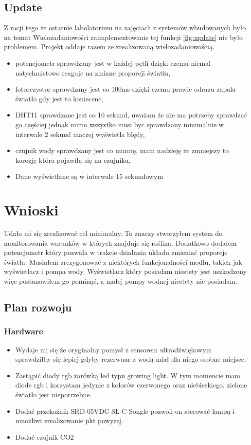 \documentclass[a4paper,11pt]{uzreport}
\begin{document}
    \subsection{Update}
    Z racji tego że ostatnie labolatorium na zajęciach z systemów wbudowanych było na temat Wielozadaniowości zaimplementowanie tej funkcji \ref{fig:update} nie było problemem. Projekt oddaje razem ze zrealizowaną wielozadaniowością.
    \begin{itemize}
        \item potencjometr sprawdzany jest w każdej pętli dzięki czemu niemal natychmistowo reaguje na zmiane proporcji światła,
        \item fotorezystor sprawdzany jest co 100ms dzięki czemu prawie odrazu zapala światło gdy jest to konieczne,
        \item DHT11 sprawdzane jest co 10 sekund, uważam że nie ma potrzeby sprawdzać go częściej jednak mimo wszystko musi byc sprawdzany minimalnie w interwale 2 sekund inaczej wyświetla błędy,
        \item czujnik wody sprawdzany jest co minutę, mam nadzieję że zmniejszy to korozję która pojawiła się na czujniku,
        \item Dane wyświetlane są w interwale 15 sekundowym
    \end{itemize}

\section{Wnioski}
Udało mi się zrealizować cel minimalny. To znaczy stworzyłem system do monitorowania warunków w których znajduje się roślina. Dodatkowo dodałem potencjometr który pozwala w trakcie działania układu zmieniać proporcje światła. Musiałem zrezygonować z niektórych funkcjonalności modlu, takich jak wyświetlacz i pompa wody. Wyświetlacz który posiadam niestety jest uszkodzony więc postanowiłem go pominąć, a małej pompy wodnej niestety nie posiadam.
\subsection{Plan rozwoju}
\subsubsection{Hardware}
\begin{itemize}
    \item  Wydaje mi się że oryginalny pomysł z sensorem ultradźwiękowym sprawdziłby się lepiej gdyby rezerwuar z wodą miał dla niego osobne miejsce.
    \item Zastąpić diody rgb żarówką led typu growing light. W tym momencie mam diode rgb i korzystam jedynie z kolorów czerwonego oraz niebieskiego, zielone światło jest niepotrzebne.
    \item Dodać przekaźnik SRD-05VDC-SL-C Songle pozwoli on sterować lampą i umożliwi zrealizowanie pkt powyżej.
    \item Dodać czujnik CO2
\end{itemize}
\end{document}

